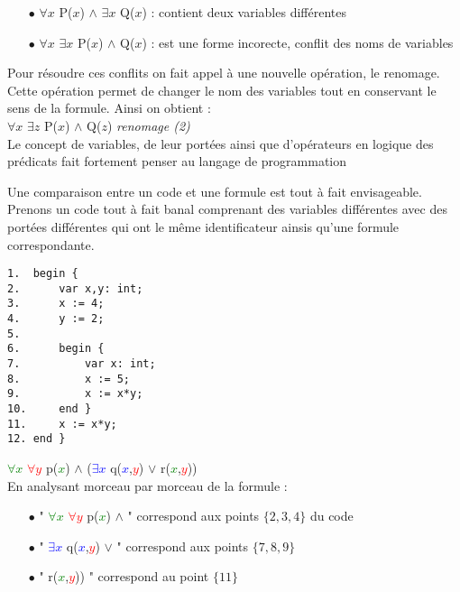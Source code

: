 \begin{itemize}
\item[$\bullet$] $\forall x$ P($x$) $\wedge$ $\exists x$ Q($x$) : contient deux variables différentes\\
 
\item[$\bullet$] $\forall x$ $\exists x$  P($x$) $\wedge$ Q($x$) : est une forme incorecte, conflit des noms de variables \\
\end{itemize}

Pour résoudre ces conflits on fait appel à une nouvelle opération, le renomage. Cette opération permet de changer le nom des variables tout en conservant le sens de la formule. Ainsi on obtient : \\

 $\forall x$ $\exists z$  P($x$) $\wedge$ Q($z$)  \textit{renomage (2)} \\
 
 Le concept de variables, de leur portées ainsi que d'opérateurs en logique des prédicats fait fortement penser au langage de programmation
 
Une comparaison entre un code et une formule est tout à fait envisageable. Prenons un code tout à fait banal comprenant des variables différentes avec des portées différentes qui ont le même identificateur ainsis qu'une formule correspondante. 

\begin{verbatim}
1.  begin {
2.      var x,y: int;        
3.      x := 4;
4.      y := 2;
5.    
6.      begin {
7.          var x: int;
8.          x := 5;
9.          x := x*y;
10.     end }
11.     x := x*y;
12. end }
\end{verbatim}


\textcolor{Green}{$\forall x$} \textcolor{Red}{$\forall y$} p(\textcolor{Green}{$x$}) $\wedge$ (\textcolor{Blue}{$\exists x$}  q(\textcolor{Blue}{$x$},\textcolor{Red}{$y$}) $\vee$ r(\textcolor{Green}{$x$},\textcolor{Red}{$y$}))  \\ 

En analysant morceau par morceau de la formule : \\

\begin{itemize}

\item[$\bullet$] " \textcolor{Green}{$\forall x$} \textcolor{Red}{$\forall y$} p(\textcolor{Green}{$x$}) $\wedge$ " correspond aux points $\lbrace 2,3,4 \rbrace$ du code \\

\item[$\bullet$]" \textcolor{Blue}{$\exists x$}  q(\textcolor{Blue}{$x$},\textcolor{Red}{$y$}) $\vee$ " correspond aux points $\lbrace 7,8,9 \rbrace$ \\
 
\item[$\bullet$]" r(\textcolor{Green}{$x$},\textcolor{Red}{$y$})) "  correspond au point $\lbrace 11 \rbrace$ \\

\end{itemize}

